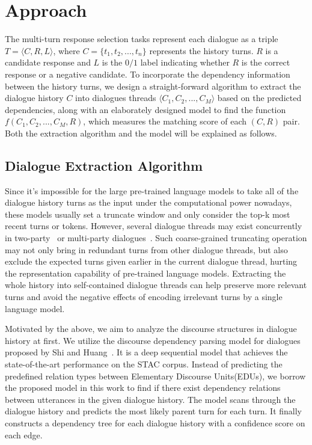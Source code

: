 \section{Approach}


The multi-turn response selection tasks represent each dialogue as a triple $T=\langle C, R, L\rangle$, where $C=\{t_1, t_2,...,t_n\}$ represents the history turns. $R$ is a candidate response and $L$ is the $0/1$ label indicating whether $R$ is the correct response or a negative candidate. To incorporate the dependency information between the history turns, we design a straight-forward algorithm to extract the dialogue history $C$ into dialogues threads $\langle C_1, C_2, ..., C_M\rangle$ based on the predicted dependencies, along with an elaborately designed model to find the function $f(C_1, C_2, ..., C_M, R)$, which measures the matching score of each $(C, R)$ pair. Both the extraction algorithm and the model will be explained as follows.%

\subsection{Dialogue Extraction Algorithm}
\label{sec:DSA}
Since it's impossible for the large pre-trained language models to take all of the dialogue history turns as the input under the computational power nowadays, these models usually set a truncate window and only consider the top-k most recent turns or tokens. However, several dialogue threads may exist concurrently in two-party~\cite{DuPX17} or multi-party dialogues~\cite{TanWGWPGCY19}. Such coarse-grained truncating operation may not only bring in redundant turns from 
other dialogue threads, but also exclude the expected turns given earlier 
in the current dialogue thread, hurting the representation capability of pre-trained language models. Extracting the whole history into self-contained dialogue threads can help preserve more relevant turns and avoid the negative effects of encoding irrelevant turns by a single language model.




Motivated by the above, we aim to analyze the discourse structures in dialogue history at first. We utilize the discourse dependency parsing model for dialogues proposed by Shi and Huang~. It is a deep sequential model that achieves the state-of-the-art performance on the STAC corpus.
Instead of predicting the predefined relation types between Elementary Discourse Units(EDUs), we borrow the proposed model in this work to find if there exist dependency relations between utterances in the given dialogue history.
The model scans through the dialogue history and predicts the most likely parent turn for each turn. 
It finally constructs a dependency tree for each dialogue history with a confidence score 
on each edge.



